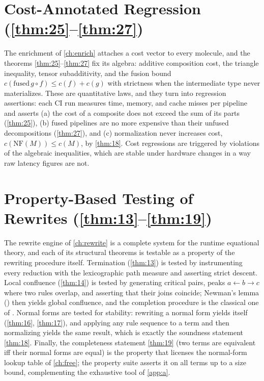 \section{Cost-Annotated Regression (\autoref{thm:25}--\autoref{thm:27})}
The enrichment of \autoref{ch:enrich} attaches a cost vector to every molecule, and the theorems \ref{thm:25}--\ref{thm:27} fix its algebra: additive composition cost, the triangle inequality, tensor subadditivity, and the fusion bound $c (\mathrm{fused}\, g\circ f) \le c (f)+c (g)$ with strictness when the intermediate type never materializes. These are quantitative laws, and they turn into regression assertions: each CI run measures time, memory, and cache misses per pipeline and asserts (a) the cost of a composite does not exceed the sum of its parts (\autoref{thm:25}), (b) fused pipelines are no more expensive than their unfused decompositions (\autoref{thm:27}), and (c) normalization never increases cost, $c (\mathrm{NF} (M)) \le c (M)$, by \ref{thm:18}. Cost regressions are triggered by violations of the algebraic inequalities, which are stable under hardware changes in a way raw latency figures are not.

\section{Property-Based Testing of Rewrites (\autoref{thm:13}--\autoref{thm:19})}
The rewrite engine of \autoref{ch:rewrite} is a complete system for the runtime equational theory, and each of its structural theorems is testable as a property of the rewriting procedure itself. Termination (\ref{thm:13}) is tested by instrumenting every reduction with the lexicographic path measure and asserting strict descent. Local confluence (\ref{thm:14}) is tested by generating critical pairs, peaks $a \gets b \to c$ where two rules overlap, and asserting that their joins coincide; Newman's lemma (\cite{newman}) then yields global confluence, and the completion procedure is the classical one of \cite{knuthbendix}. Normal forms are tested for stability: rewriting a normal form yields itself (\ref{thm:16}, \ref{thm:17}), and applying any rule sequence to a term and then normalizing yields the same result, which is exactly the soundness statement \ref{thm:18}. Finally, the completeness statement \ref{thm:19} (two terms are equivalent iff their normal forms are equal) is the property that licenses the normal-form lookup table of \autoref{ch:free}; the property suite asserts it on all terms up to a size bound, complementing the exhaustive tool of \autoref{app:a}.

